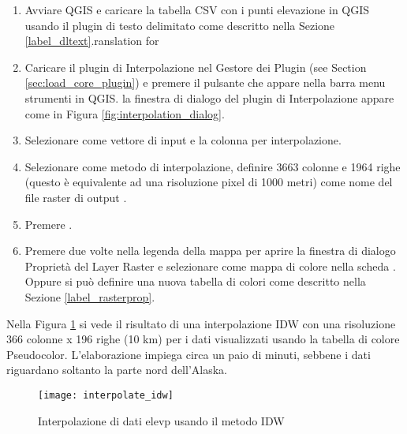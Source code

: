 \begin{enumerate}
  \item Avviare QGIS e caricare la  tabella CSV con i punti elevazione in QGIS usando il plugin di testo delimitato come descritto nella Sezione \ref{label_dltext}.ranslation for 
  \item Caricare il plugin di Interpolazione nel Gestore dei Plugin (see Section 
  \ref{sec:load_core_plugin}) e premere il pulsante  che appare nella barra menu strumenti in QGIS. la finestra di dialogo del plugin di Interpolazione appare come in Figura \ref{fig:interpolation_dialog}.
  \item Selezionare  come vettore di input e la colonna  per interpolazione.
  \item Selezionare  come metodo di interpolazione, definire 
  3663 colonne e 1964 righe (questo è equivalente ad una risoluzione pixel di 1000 metri) come nome del file raster di output .
  \item Premere .
  \item Premere due volte  nella legenda della mappa per aprire la finestra di dialogo Proprietà del Layer Raster e selezionare  come mappa di colore nella scheda . Oppure 
  si può definire una nuova tabella di colori come descritto nella Sezione \ref{label_rasterprop}.
\end{enumerate}

Nella Figura \ref{fig:interpolation_idw} si vede il risultato di una interpolazione IDW con una risoluzione 366 colonne x 196 righe (10 km) per i dati  visualizzati usando la tabella di colore Pseudocolor. L'elaborazione impiega circa un paio di minuti, sebbene i dati riguardano soltanto la parte nord dell'Alaska.

\begin{figure}[ht]
   \begin{center}
   \caption{Interpolazione di dati elevp usando il metodo IDW \nixcaption}\label{fig:interpolation_idw}\smallskip
   \texttt{[image: interpolate\_idw]}
\end{center}  
\end{figure}

\newpage



